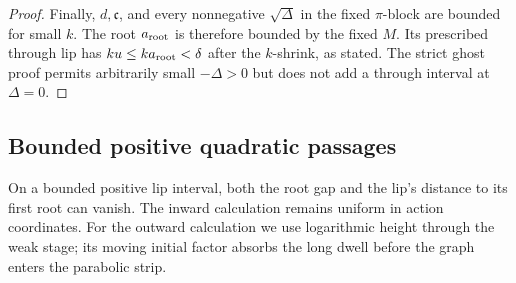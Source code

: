 \begin{proof}
Finally, \(d,\mathfrak c\), and every nonnegative
\(\sqrt{\Delta}\) in the fixed \(\pi\)-block are bounded for
small \(k\). The root \(a_{\rm root}\) is therefore bounded by
the fixed \(M\). Its prescribed through lip has
\(ku\le ka_{\rm root}<\delta\) after the \(k\)-shrink, as stated.
The strict ghost proof permits arbitrarily small \(-\Delta>0\)
but does not add a through interval at \(\Delta=0\).
\end{proof}

\subsection{Bounded positive quadratic passages}

On a bounded positive lip interval, both the root gap and the lip's
distance to its first root can vanish. The inward calculation remains
uniform in action coordinates. For the outward calculation we use
logarithmic height through the weak stage; its moving initial factor
absorbs the long dwell before the graph enters the parabolic strip.

